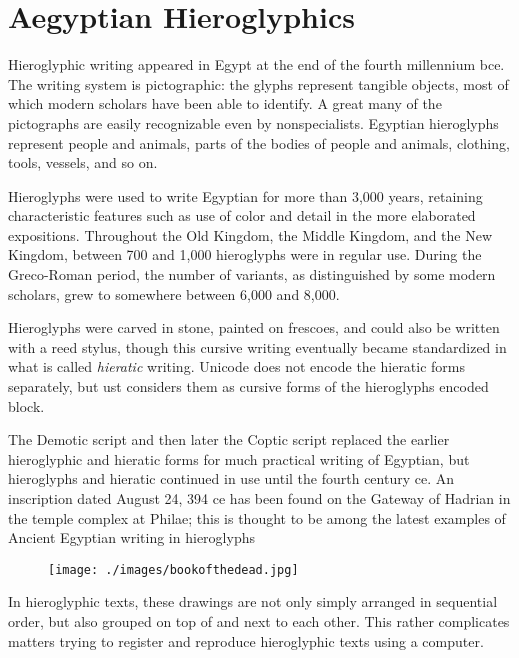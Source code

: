 \newfontfamily{}

\chapter{Aegyptian Hieroglyphics}


\newfontfamily{}

Hieroglyphic writing appeared in Egypt at the end of the fourth millennium bce. The writing
system is pictographic: the glyphs represent tangible objects, most of which modern
scholars have been able to identify. A great many of the pictographs are easily recognizable
even by nonspecialists. Egyptian hieroglyphs represent people and animals, parts of the
bodies of people and animals, clothing, tools, vessels, and so on.

Hieroglyphs were used to write Egyptian for more than 3,000 years, retaining characteristic
features such as use of color and detail in the more elaborated expositions. Throughout the
Old Kingdom, the Middle Kingdom, and the New Kingdom, between 700 and 1,000 hieroglyphs
were in regular use. During the Greco-Roman period, the number of variants, as
distinguished by some modern scholars, grew to somewhere between 6,000 and 8,000.

Hieroglyphs were carved in stone, painted on frescoes, and could also be written with a reed
stylus, though this cursive writing eventually became standardized in what is called \emph{hieratic}
writing. Unicode does not encode the hieratic forms separately, but ust considers them as cursive forms of the hieroglyphs encoded block.

The Demotic script and then later the Coptic script replaced the earlier hieroglyphic and
hieratic forms for much practical writing of Egyptian, but hieroglyphs and hieratic continued
in use until the fourth century ce. An inscription dated August 24, 394 ce has been
found on the Gateway of Hadrian in the temple complex at Philae; this is thought to be
among the latest examples of Ancient Egyptian writing in hieroglyphs

\begin{figure}[htb]
\texttt{[image: ./images/bookofthedead.jpg]}
\end{figure}

In hieroglyphic texts, these drawings are not only simply arranged in sequential order, but also grouped on top of and next to each other. This rather complicates matters trying to register and reproduce hieroglyphic texts using a computer.

